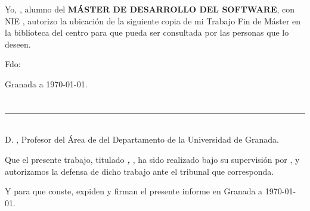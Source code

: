 Yo, \textbf{\estudiante}, alumno del \textbf{MÁSTER DE DESARROLLO DEL SOFTWARE}, con NIE \textbf{\dni}, autorizo la ubicación de la siguiente copia de mi Trabajo Fin de Máster en la biblioteca del centro para que pueda ser consultada por las personas que lo deseen.

\vspace{6cm}

\noindent Fdo: \emph{\estudiante}

\vspace{2cm}

\begin{flushright}
Granada a \today.
\end{flushright}


\chapter*{}
\thispagestyle{empty}

\noindent\rule[-1ex]{\textwidth}{2pt}\\[4.5ex]

D. \textbf{\tutorA}, Profesor del Área de {\areaA} del Departamento {\departamentoA} de la Universidad de Granada.

\vspace{0.5cm}


\vspace{0.5cm}


\vspace{0.5cm}

Que el presente trabajo, titulado \textit{\textbf{\tituloTFM, \subtituloTFM}},
ha sido realizado bajo su supervisión por \textbf{\estudiante}, y autorizamos la defensa de dicho trabajo ante el tribunal
que corresponda.

\vspace{0.5cm}

Y para que conste, expiden y firman el presente informe en Granada a \today.

\vspace{1cm}


\vspace{5cm}

